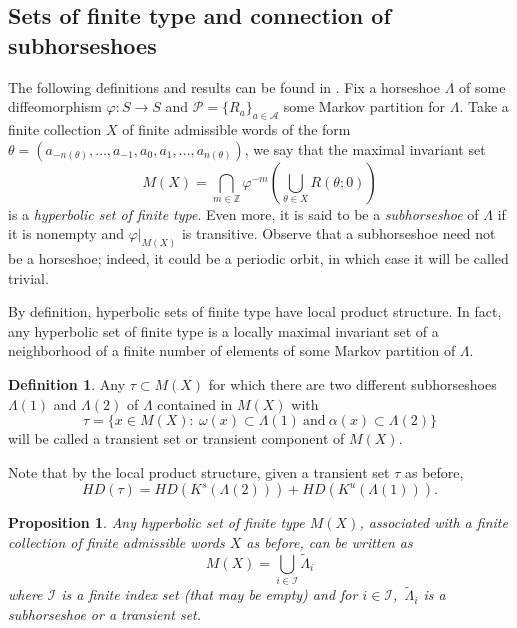 \documentclass[12pt]{amsart}
\theoremstyle{plain} %
\newtheorem{proposition}[theorem]{Proposition}
\theoremstyle{definition} %
\newtheorem{definition}[theorem]{Definition}
\numberwithin{equation}{section}
\begin{document}
\subsection{Sets of finite type and connection of subhorseshoes}

The following definitions and results can be found in \cite{GC}. Fix a horseshoe $\Lambda$ of some diffeomorphism $\varphi:S\rightarrow S$ and $\mathcal{P}=\{R_a\}_{a\in \mathcal{A}}$ some Markov partition for $\Lambda$. Take a finite collection $X$ of finite admissible words of the form $\theta=(a_{-n(\theta)},\dots,a_{-1},a_0,a_1,\dots,a_{n(\theta)})$, we say that the maximal invariant set 
$$M(X)=\bigcap \limits_{m \in \mathbb{Z}} \varphi ^{-m}(\bigcup \limits_{\theta \in X}  R(\theta;0))$$ 
is a \textit{hyperbolic set of finite type}. Even more, it is said to be a \textit{subhorseshoe} of $\Lambda$ if it is nonempty and $\varphi|_{M(X)}$ is transitive. Observe that a subhorseshoe need not be a horseshoe; indeed, it could be a periodic orbit, in which case it will be called trivial.

By definition, hyperbolic sets of finite type have local product structure. In fact, any hyperbolic set of finite type is a locally maximal invariant set of a neighborhood of a finite number of elements of some Markov partition of $\Lambda$.

\begin{definition}
Any $\tau \subset M(X)$ for which there are two different subhorseshoes $\Lambda(1)$ and $\Lambda(2)$ of $\Lambda$ contained in $M(X)$ with 
$$\tau=\{x\in M(X):\ \omega(x)\subset \Lambda(1)\ \text{and}\ \alpha(x)\subset \Lambda(2)  \}$$
will be called a transient set or transient component of $M(X)$.
\end{definition}

Note that by the local product structure, given a transient set $\tau$ as before,
\begin{equation}
    HD(\tau)=HD(K^s(\Lambda(2)))+HD(K^u(\Lambda(1))).
\end{equation}

\begin{proposition}\label{appendix}
Any hyperbolic set of finite type $M(X)$, associated with a finite collection of finite admissible words $X$ as before, can be written as
$$M(X)=\bigcup \limits_{i\in \mathcal{I}} \tilde{\Lambda}_i $$ 
where $\mathcal{I}$ is a finite index set (that may be empty) and for $i\in \mathcal{I}$,\ $\tilde{\Lambda}_i$ is a subhorseshoe or a transient set.
\end{proposition}
\end{document}
